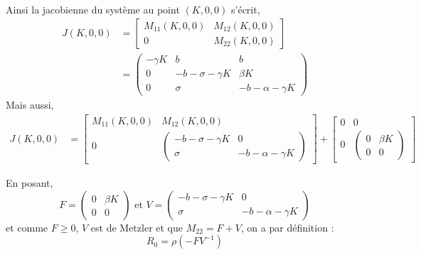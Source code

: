 \documentclass[11pt]{article}
\begin{document}
\paragraph{}
Ainsi la jacobienne du syst\`eme au  point $(K,0,0)$ s'\'ecrit, 
\begin{align*}
	J(K,0,0) &= \begin{bmatrix}
		M_{11}(K,0,0) & M_{12}(K,0,0) \\ 0 & M_{22}(K,0,0)
	\end{bmatrix}\\
	&= \begin{pmatrix}
	-\gamma K & b & b\\
	0 & -b-\sigma - \gamma K  & \beta K\\
	0&  \sigma & -b - \alpha - \gamma K
	\end{pmatrix}
\end{align*}
Mais aussi, 
\begin{align*}
	J(K,0,0) &= 
		\begin{bmatrix}
			M_{11}(K,0,0) & M_{12}(K,0,0) \\ 0 & 
			\begin{pmatrix}
				-b-\sigma - \gamma K  & 0\\
				\sigma & -b - \alpha - \gamma K
			\end{pmatrix}
		\end{bmatrix} + 
		\begin{bmatrix}
			0 & 0 \\ 0 & 
			\begin{pmatrix}
				0 & \beta K\\
				0 & 0
			\end{pmatrix}
		\end{bmatrix}
\end{align*}

En posant, 
\[
	F = \begin{pmatrix}
				0 & \beta K\\
				0 & 0
			\end{pmatrix} \text{ et } V = \begin{pmatrix}
				-b-\sigma - \gamma K  & 0\\
				\sigma & -b - \alpha - \gamma K
			\end{pmatrix}
\]
et comme $F \geq 0$, $V$ est de Metzler et que $M_{22} =  F + V$, on a par d\'efinition :
\[
R_0 = \rho (-FV^{-1})
\] 
\end{document}

